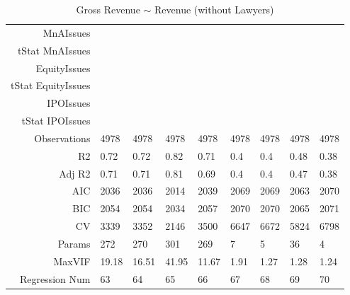 \begin{table}[ht]
\begin{tabular}{rllllllll}
  MnAIssues &  &  &  &  &  &  &  &  \\ 
  tStat MnAIssues &  &  &  &  &  &  &  &  \\ 
  EquityIssues &  &  &  &  &  &  &  &  \\ 
  tStat EquityIssues &  &  &  &  &  &  &  &  \\ 
  IPOIssues &  &  &  &  &  &  &  &  \\ 
  tStat IPOIssues &  &  &  &  &  &  &  &  \\ 
  Observations & 4978 & 4978 & 4978 & 4978 & 4978 & 4978 & 4978 & 4978 \\ 
  R2 & 0.72 & 0.72 & 0.82 & 0.71 & 0.4 & 0.4 & 0.48 & 0.38 \\ 
  Adj R2 & 0.71 & 0.71 & 0.81 & 0.69 & 0.4 & 0.4 & 0.47 & 0.38 \\ 
  AIC & 2036 & 2036 & 2014 & 2039 & 2069 & 2069 & 2063 & 2070 \\ 
  BIC & 2054 & 2054 & 2034 & 2057 & 2070 & 2070 & 2065 & 2071 \\ 
  CV & 3339 & 3352 & 2146 & 3500 & 6647 & 6672 & 5824 & 6798 \\ 
  Params & 272 & 270 & 301 & 269 & 7 & 5 & 36 & 4 \\ 
  MaxVIF & 19.18 & 16.51 & 41.95 & 11.67 & 1.91 & 1.27 & 1.28 & 1.24 \\ 
  Regression Num & 63 & 64 & 65 & 66 & 67 & 68 & 69 & 70 \\ 
   \hline
\end{tabular}
\caption{Gross Revenue $\sim$ Revenue (without Lawyers)} 
\end{table}
